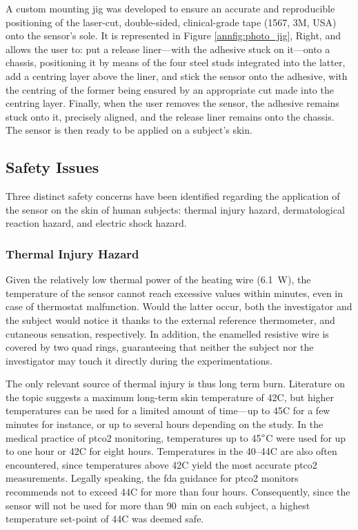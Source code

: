 A custom mounting jig was developed to ensure an accurate and reproducible positioning of the laser-cut, double-sided, clinical-grade tape (1567, 3M, USA) onto the sensor's sole. It is represented in Figure \ref{annfig:photo_jig}, Right, and allows the user to:  put a release liner---with the adhesive stuck on it---onto a chassis, positioning it by means of the four steel studs integrated into the latter,  add a centring layer above the liner, and  stick the sensor onto the adhesive, with the centring of the former being ensured by an appropriate cut made into the centring layer. Finally, when  the user removes the sensor, the adhesive remains stuck onto it, precisely aligned, and the release liner remains onto the chassis. The sensor is then ready to be applied on a subject's skin.

\subsection{Safety Issues}\label{annsect:safety_issue}

Three distinct safety concerns have been identified regarding the application of the sensor on the skin of human subjects: thermal injury hazard, dermatological reaction hazard, and electric shock hazard.

\subsubsection{Thermal Injury Hazard}\label{annsect:temp_harm}

Given the relatively low thermal power of the heating wire (6.1~W), the temperature of the sensor cannot reach excessive values within minutes, even in case of thermostat malfunction. Would the latter occur, both the investigator and the subject would notice it thanks to the external reference thermometer, and cutaneous sensation, respectively. In addition, the enamelled resistive wire is covered by two quad rings, guaranteeing that neither the subject nor the investigator may touch it directly during the experimentations.

The only relevant source of thermal injury is thus long term burn. Literature on the topic suggests a maximum long-term skin temperature of 42{\degree}C, but higher temperatures can be used for a limited amount of time---up to 45{\degree}C for a few minutes for instance\cite{lawrence1976}, or up to several hours depending on the study\cite{moritz1947}. In the medical practice of \gls{ptco2} monitoring, temperatures up to 45$\degree$C were used for up to one hour\cite{wimberley1985a} or 42{\degree}C for eight hours\cite{bendjelid2005}. Temperatures in the 40--44{\degree}C are also often encountered, since temperatures above 42{\degree}C yield the most accurate \gls{ptco2} measurements\cite{conway2018}. Legally speaking, the \gls{fda} guidance for \gls{ptco2} monitors recommends not to exceed 44{\degree}C for more than four hours\cite{fda_transcut}. Consequently, since the sensor will not be used for more than 90~min on each subject, a highest temperature set-point of 44{\degree}C was deemed safe.

